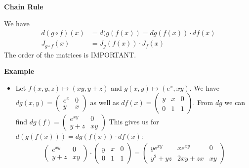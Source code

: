 \documentclass[25pt]{sciposter}
\newenvironment{method}[1]{\begin{mdframed}[backgroundcolor=blue!10,innertopmargin=15pt, innerbottommargin=15pt, nobreak=true]
		\textbf{#1 }
	}
	{ 
	\end{mdframed}
}
\begin{document}
\begin{multicols}{3}
\begin{method}{Chain Rule}
	We have 
	\begin{align*}
		d(g \circ f)(x) &= d(g(f(x)) = dg(f(x))\cdot df(x)\\
		J_{g\circ f}(x) &= J_{g}(f(x)) \cdot J_{f} (x)
	\end{align*}
	The order of the matrices is IMPORTANT.
\end{method}
\textbf{Example}
\begin{itemize}
	\item Let $f(x,y,z)\mapsto (xy,y+z)$ and $g(x,y) \mapsto (e^x,xy)$.
	We have $dg(x,y) = \begin{pmatrix}
	e^x & 0 \\ y & x
	\end{pmatrix}$ as well as $df(x) = \begin{pmatrix}
	y & x & 0 \\ 0 & 1 & 1
	\end{pmatrix}$. From $dg$ we can find $dg(f) = \begin{pmatrix}
	e^{xy} & 0 \\ y+z & xy
	\end{pmatrix}$ This gives us for $d(g(f(x))) = dg(f(x))\cdot df(x)$:
	\begin{align*} \begin{pmatrix}
	e^{xy} & 0 \\ y+z & xy
	\end{pmatrix} \cdot \begin{pmatrix}
	y & x & 0 \\ 0 & 1 & 1
	\end{pmatrix} = 
	\begin{pmatrix}
	ye^{xy} & xe^{xy} & 0 \\ y^2+yz & 2xy +zx & xy
	\end{pmatrix}
	\end{align*}
	

\end{itemize}
\end{multicols}
\end{document}
